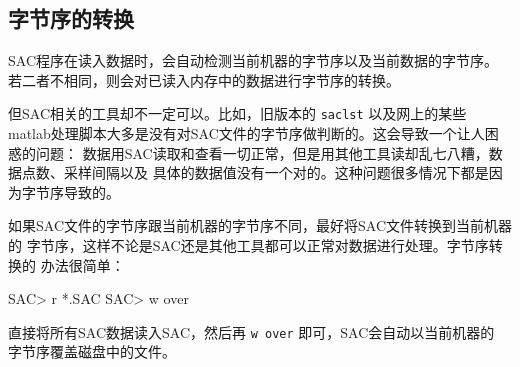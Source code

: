 \subsection{字节序的转换}
SAC程序在读入数据时，会自动检测当前机器的字节序以及当前数据的字节序。
若二者不相同，则会对已读入内存中的数据进行字节序的转换。

但SAC相关的工具却不一定可以。比如，旧版本的 \texttt{saclst} 以及网上的某些
matlab处理脚本大多是没有对SAC文件的字节序做判断的。这会导致一个让人困惑的问题：
数据用SAC读取和查看一切正常，但是用其他工具读却乱七八糟，数据点数、采样间隔以及
具体的数据值没有一个对的。这种问题很多情况下都是因为字节序导致的。

如果SAC文件的字节序跟当前机器的字节序不同，最好将SAC文件转换到当前机器的
字节序，这样不论是SAC还是其他工具都可以正常对数据进行处理。字节序转换的
办法很简单：
\begin{SACCode}
SAC> r *.SAC
SAC> w over
\end{SACCode}
直接将所有SAC数据读入SAC，然后再 \texttt{w over} 即可，SAC会自动以当前机器的
字节序覆盖磁盘中的文件。